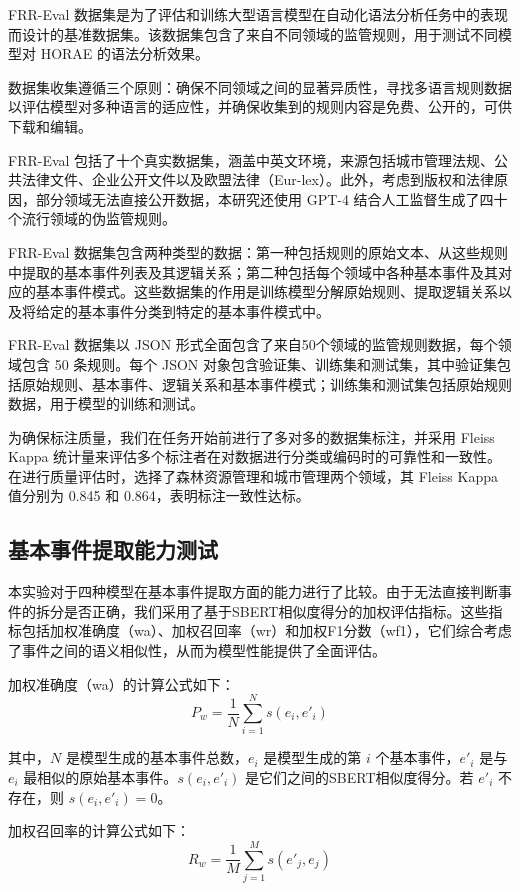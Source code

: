 FRR-Eval 数据集是为了评估和训练大型语言模型在自动化语法分析任务中的表现而设计的基准数据集。该数据集包含了来自不同领域的监管规则，用于测试不同模型对 HORAE 的语法分析效果。

数据集收集遵循三个原则：确保不同领域之间的显著异质性，寻找多语言规则数据以评估模型对多种语言的适应性，并确保收集到的规则内容是免费、公开的，可供下载和编辑。

FRR-Eval 包括了十个真实数据集，涵盖中英文环境，来源包括城市管理法规、公共法律文件、企业公开文件以及欧盟法律（Eur-lex）。此外，考虑到版权和法律原因，部分领域无法直接公开数据，本研究还使用 GPT-4 结合人工监督生成了四十个流行领域的伪监管规则。

FRR-Eval 数据集包含两种类型的数据：第一种包括规则的原始文本、从这些规则中提取的基本事件列表及其逻辑关系；第二种包括每个领域中各种基本事件及其对应的基本事件模式。这些数据集的作用是训练模型分解原始规则、提取逻辑关系以及将给定的基本事件分类到特定的基本事件模式中。

FRR-Eval 数据集以 JSON 形式全面包含了来自50个领域的监管规则数据，每个领域包含 50 条规则。每个 JSON 对象包含验证集、训练集和测试集，其中验证集包括原始规则、基本事件、逻辑关系和基本事件模式；训练集和测试集包括原始规则数据，用于模型的训练和测试。

为确保标注质量，我们在任务开始前进行了多对多的数据集标注，并采用 Fleiss Kappa 统计量来评估多个标注者在对数据进行分类或编码时的可靠性和一致性。在进行质量评估时，选择了森林资源管理和城市管理两个领域，其 Fleiss Kappa 值分别为 0.845 和 0.864，表明标注一致性达标。

\subsection{基本事件提取能力测试}

本实验对于四种模型在基本事件提取方面的能力进行了比较。由于无法直接判断事件的拆分是否正确，我们采用了基于SBERT相似度得分的加权评估指标。这些指标包括加权准确度（wa）、加权召回率（wr）和加权F1分数（wf1），它们综合考虑了事件之间的语义相似性，从而为模型性能提供了全面评估。

加权准确度（wa）的计算公式如下：
\[ P_w = \frac{1}{N} \sum_{i=1}^{N} s(e_i, e'_i) \]

其中，\( N \) 是模型生成的基本事件总数，\( e_i \) 是模型生成的第 \( i \) 个基本事件，\( e'_i \) 是与 \( e_i \) 最相似的原始基本事件。\( s(e_i, e'_i) \) 是它们之间的SBERT相似度得分。若 \( e'_i \) 不存在，则 \( s(e_i, e'_i) = 0 \)。

加权召回率的计算公式如下：
\[ R_w = \frac{1}{M} \sum_{j=1}^{M} s(e'_j, e_j) \]

